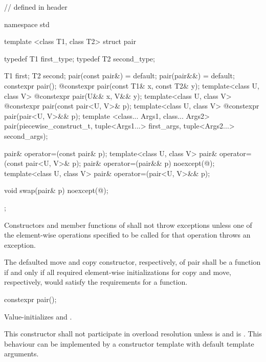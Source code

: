 %
\begin{codeblock}
// defined in header 

namespace std {
  template <class T1, class T2>
  struct pair {
    typedef T1 first_type;
    typedef T2 second_type;

    T1 first;
    T2 second;
    pair(const pair&) = default;
    pair(pair&&) = default;
    constexpr pair();
    @\EXPLICIT@ constexpr pair(const T1& x, const T2& y);
    template<class U, class V> @\EXPLICIT@ constexpr pair(U&& x, V&& y);
    template<class U, class V> @\EXPLICIT@ constexpr pair(const pair<U, V>& p);
    template<class U, class V> @\EXPLICIT@ constexpr pair(pair<U, V>&& p);
    template <class... Args1, class... Args2>
      pair(piecewise_construct_t,
           tuple<Args1...> first_args, tuple<Args2...> second_args);

    pair& operator=(const pair& p);
    template<class U, class V> pair& operator=(const pair<U, V>& p);
    pair& operator=(pair&& p) noexcept(@\seebelow@);
    template<class U, class V> pair& operator=(pair<U, V>&& p);

    void swap(pair& p) noexcept(@\seebelow@);
  };
}
\end{codeblock}

\pnum
Constructors and member functions of  shall not throw exceptions unless one of
the element-wise operations specified to be called for that operation
throws an exception.

\pnum
The defaulted move and copy constructor, respectively, of pair shall
be a  function if and only if all required element-wise
initializations for copy and move, respectively, would satisfy the
requirements for a  function.

\begin{itemdecl}
constexpr pair();
\end{itemdecl}

\begin{itemdescr}
\pnum
\effects
Value-initializes  and .

\pnum
\remarks
This constructor shall not participate in overload resolution unless
 is  and
 is .
\enternote This behaviour can be implemented by a constructor template
with default template arguments. \exitnote
\end{itemdescr}

